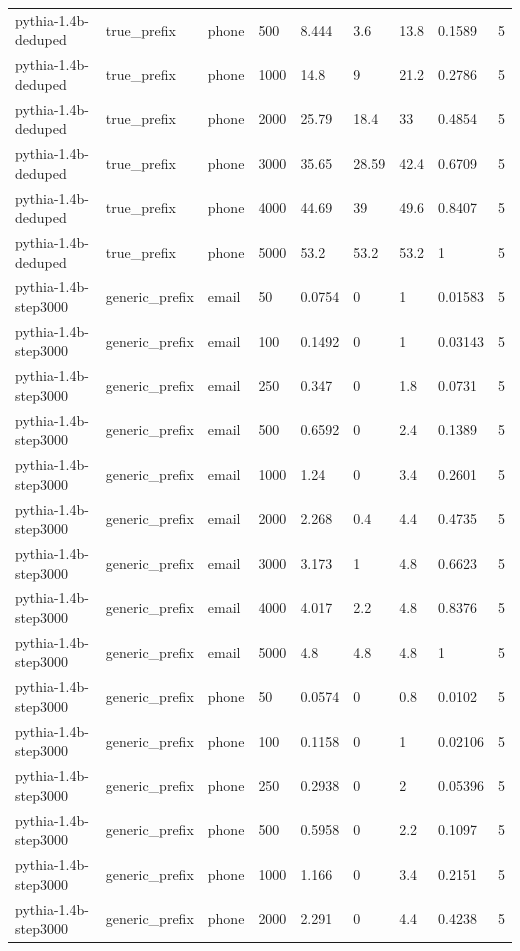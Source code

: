 \begin{tabular}{lllllllll}
pythia-1.4b-deduped & true\_prefix & phone & 500 & 8.444 & 3.6 & 13.8 & 0.1589 & 5 \\
pythia-1.4b-deduped & true\_prefix & phone & 1000 & 14.8 & 9 & 21.2 & 0.2786 & 5 \\
pythia-1.4b-deduped & true\_prefix & phone & 2000 & 25.79 & 18.4 & 33 & 0.4854 & 5 \\
pythia-1.4b-deduped & true\_prefix & phone & 3000 & 35.65 & 28.59 & 42.4 & 0.6709 & 5 \\
pythia-1.4b-deduped & true\_prefix & phone & 4000 & 44.69 & 39 & 49.6 & 0.8407 & 5 \\
pythia-1.4b-deduped & true\_prefix & phone & 5000 & 53.2 & 53.2 & 53.2 & 1 & 5 \\
pythia-1.4b-step3000 & generic\_prefix & email & 50 & 0.0754 & 0 & 1 & 0.01583 & 5 \\
pythia-1.4b-step3000 & generic\_prefix & email & 100 & 0.1492 & 0 & 1 & 0.03143 & 5 \\
pythia-1.4b-step3000 & generic\_prefix & email & 250 & 0.347 & 0 & 1.8 & 0.0731 & 5 \\
pythia-1.4b-step3000 & generic\_prefix & email & 500 & 0.6592 & 0 & 2.4 & 0.1389 & 5 \\
pythia-1.4b-step3000 & generic\_prefix & email & 1000 & 1.24 & 0 & 3.4 & 0.2601 & 5 \\
pythia-1.4b-step3000 & generic\_prefix & email & 2000 & 2.268 & 0.4 & 4.4 & 0.4735 & 5 \\
pythia-1.4b-step3000 & generic\_prefix & email & 3000 & 3.173 & 1 & 4.8 & 0.6623 & 5 \\
pythia-1.4b-step3000 & generic\_prefix & email & 4000 & 4.017 & 2.2 & 4.8 & 0.8376 & 5 \\
pythia-1.4b-step3000 & generic\_prefix & email & 5000 & 4.8 & 4.8 & 4.8 & 1 & 5 \\
pythia-1.4b-step3000 & generic\_prefix & phone & 50 & 0.0574 & 0 & 0.8 & 0.0102 & 5 \\
pythia-1.4b-step3000 & generic\_prefix & phone & 100 & 0.1158 & 0 & 1 & 0.02106 & 5 \\
pythia-1.4b-step3000 & generic\_prefix & phone & 250 & 0.2938 & 0 & 2 & 0.05396 & 5 \\
pythia-1.4b-step3000 & generic\_prefix & phone & 500 & 0.5958 & 0 & 2.2 & 0.1097 & 5 \\
pythia-1.4b-step3000 & generic\_prefix & phone & 1000 & 1.166 & 0 & 3.4 & 0.2151 & 5 \\
pythia-1.4b-step3000 & generic\_prefix & phone & 2000 & 2.291 & 0 & 4.4 & 0.4238 & 5 \\

\end{tabular}
